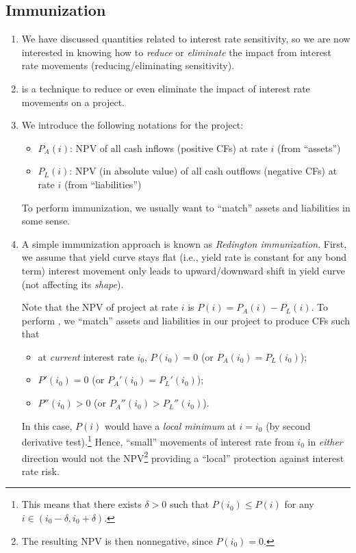 \subsection{Immunization}
\begin{enumerate}
\item We have discussed quantities related to interest rate sensitivity, so we
are now interested in knowing how to \emph{reduce} or \emph{eliminate} the
impact from interest rate movements (reducing/eliminating sensitivity).
\item {} is a technique to reduce or even eliminate the impact
of interest rate movements on a project.
\item We introduce the following notations for the project:
\begin{itemize}
\item \(P_A(i)\): NPV of all cash inflows (positive CFs) at rate \(i\) (from
``assets'')
\item \(P_L(i)\): NPV (in absolute value) of all cash outflows (negative CFs)
at rate \(i\) (from ``liabilities'')
\end{itemize}

To perform immunization, we usually want to ``match'' assets and liabilities in
some sense.
\item A simple immunization approach is known as \emph{Redington immunization}.
First, we assume that yield curve stays flat (i.e., yield rate is constant for
any bond term)  interest movement only leads to
upward/downward shift in yield curve (not affecting its \emph{shape}).

Note that the NPV of project at rate \(i\) is \(P(i)=P_A(i)-P_L(i)\). To perform
, we ``match'' assets and liabilities in our
project to produce CFs such that
\begin{itemize}
\item at \emph{current} interest rate \(i_0\), \(P(i_0)=0\) (or \(P_A(i_0)=P_L(i_0)\));
\item \(P'(i_0)=0\) (or \(P_A'(i_0)=P_L'(i_0)\));
\item \(P''(i_0)>0\) (or \(P_A''(i_0)>P_L''(i_0)\)).
\end{itemize}
In this case, \(P(i)\) would have a \emph{local minimum} at \(i=i_0\) (by
second derivative test).\footnote{This means that there exists \(\delta>0\)
such that \(P(i_0)\le P(i)\) for any \(i\in(i_0-\delta,i_0+\delta)\).} Hence,
``small'' movements of interest rate from \(i_0\) in \emph{either} direction
would not  the NPV\footnote{The resulting NPV is
then nonnegative, since \(P(i_0)=0\).}  providing a
``local'' protection against interest rate risk.
\end{enumerate}
